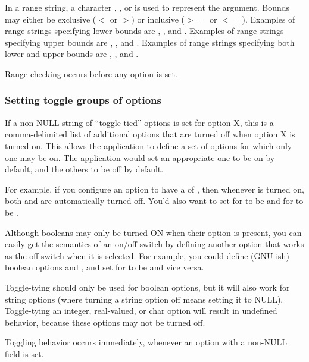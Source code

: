 In a range string, a character , , or  is
used to represent the argument. Bounds may either be exclusive ($<$ or
$>$) or inclusive ($>=$ or $<=$). Examples of range strings specifying
lower bounds are , , and
. Examples of range strings specifying upper bounds are
, , and . Examples of
range strings specifying both lower and upper bounds are
, , and .

Range checking occurs before any option is set.

   \subsubsection{Setting toggle groups of options}

If a non-NULL string  of ``toggle-tied'' options is
set for option X, this is a comma-delimited list of additional options
that are turned off when option X is turned on. This allows the
application to define a set of options for which only one may be
on. The application would set an appropriate one to be on by default,
and the others to be off by default.

For example, if you configure an option  to have a
 of , then whenever  is
turned on, both  and  are automatically turned
off. You'd also want to set  for  to be
 and  for  to be
.

Although booleans may only be turned ON when their option is present,
you can easily get the semantics of an on/off switch by defining
another option that works as the off switch when it is selected. For
example, you could define (GNU-ish) boolean options  and
, and set  for  to be
 and vice versa.  

Toggle-tying should only be used for boolean options, but it will also
work for string options (where turning a string option off means
setting it to NULL). Toggle-tying an integer, real-valued, or char
option will result in undefined behavior, because these options may
not be turned off.

Toggling behavior occurs immediately, whenever an option with a
non-NULL  field is set.

